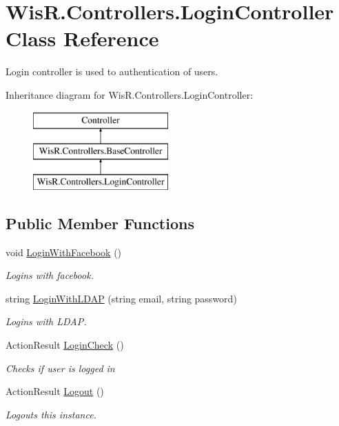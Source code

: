 \hypertarget{class_wis_r_1_1_controllers_1_1_login_controller}{}\section{Wis\+R.\+Controllers.\+Login\+Controller Class Reference}
\label{class_wis_r_1_1_controllers_1_1_login_controller}


Login controller is used to authentication of users.  


Inheritance diagram for Wis\+R.\+Controllers.\+Login\+Controller\+:\begin{figure}[H]
\begin{center}
\leavevmode
\includegraphics[height=3.000000cm]{class_wis_r_1_1_controllers_1_1_login_controller}
\end{center}
\end{figure}
\subsection*{Public Member Functions}
\begin{DoxyCompactItemize}
\item 
void \hyperlink{class_wis_r_1_1_controllers_1_1_login_controller_a5db6eeb553a22b111ce5509cbb3ae4c9}{Login\+With\+Facebook} ()
\begin{DoxyCompactList}\small\item\em Logins with facebook. \end{DoxyCompactList}\item 
string \hyperlink{class_wis_r_1_1_controllers_1_1_login_controller_ad301cfb84803fd998ce272f8ea352c4f}{Login\+With\+L\+D\+A\+P} (string email, string password)
\begin{DoxyCompactList}\small\item\em Logins with L\+D\+A\+P. \end{DoxyCompactList}\item 
Action\+Result \hyperlink{class_wis_r_1_1_controllers_1_1_login_controller_ad02c10e867f6d35e9e564e46d58c1ff4}{Login\+Check} ()
\begin{DoxyCompactList}\small\item\em Checks if user is logged in \end{DoxyCompactList}\item 
Action\+Result \hyperlink{class_wis_r_1_1_controllers_1_1_login_controller_aa24df53e902d7b4c0169ca1cdfef98d4}{Logout} ()
\begin{DoxyCompactList}\small\item\em Logouts this instance. \end{DoxyCompactList}\end{DoxyCompactItemize}

